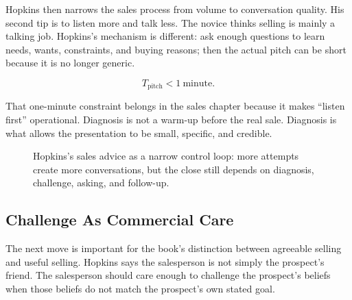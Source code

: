\documentclass[11pt,oneside]{book}
\begin{document}
Hopkins then narrows the sales process from volume to conversation quality. His second tip is to listen more and talk less. The novice thinks selling is mainly a talking job. Hopkins's mechanism is different: ask enough questions to learn needs, wants, constraints, and buying reasons; then the actual pitch can be short because it is no longer generic.

\begin{equation}
T_{\mathrm{pitch}} < 1\ \mathrm{minute}.
\end{equation}

That one-minute constraint belongs in the sales chapter because it makes ``listen first'' operational. Diagnosis is not a warm-up before the real sale. Diagnosis is what allows the presentation to be small, specific, and credible.

\begin{figure}
\centering
{}
\caption{Hopkins's sales advice as a narrow control loop: more attempts create more conversations, but the close still depends on diagnosis, challenge, asking, and follow-up.}
\end{figure}

\subsection{Challenge As Commercial Care}

The next move is important for the book's distinction between agreeable selling and useful selling. Hopkins says the salesperson is not simply the prospect's friend. The salesperson should care enough to challenge the prospect's beliefs when those beliefs do not match the prospect's own stated goal.
\end{document}
